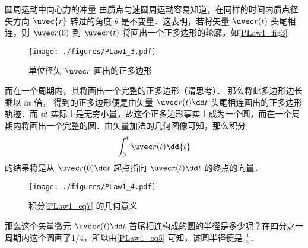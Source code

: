 \begin{example}{圆周运动中向心力的冲量}
由质点匀速圆周运动容易知道，在同样的时间内质点径矢方向 $\uvec{r}$ 转过的角度 $\theta$ 是不变量．这表明，若将矢量 $\uvec r(t)$ 头尾相连，则 $\uvec r(0)$ 到 $\uvec r(t)$ 将画出一个正多边形的轮廓，如\autoref{PLaw1_fig3} 
\begin{figure}[ht]
\centering
\texttt{[image: ./figures/PLaw1\_3.pdf]}
\caption{单位径矢 $\uvec r$ 画出的正多边形} \label{PLaw1_fig3}
\end{figure}
而在一个周期内，其将画出一个完整的正多边形（请思考）．
那么将此多边形边长乘以 $\dd t$ 倍， 得到的正多边形便是由矢量 $\uvec r(t)\dd t$ 头尾相连画出的正多边形轨迹．而 $\dd t$ 实际上是无穷小量，故这个正多边形事实上成为一个圆，而在一个周期内将画出一个完整的圆．由矢量加法的几何图像可知，那么积分
\begin{equation}\label{PLaw1_eq7}
\int_{0}^{t}\uvec r(t) \dd{t}
\end{equation}
的结果将是从 $\uvec r(0)\dd t$ 起点指向 $\uvec r(t)\dd t$ 的终点的向量．
\begin{figure}[ht]
\centering
\texttt{[image: ./figures/PLaw1\_4.pdf]}
\caption{积分\autoref{PLaw1_eq7} 的几何意义} \label{PLaw1_fig4}
\end{figure}
那么这个矢量微元 $\uvec r(t)\dd t$ 首尾相连构成的圆的半径是多少呢？在四分之一周期内这个圆画了1/4，所以由\autoref{PLaw1_eq5} 可知，该圆半径便是 $\frac{1}{\omega}$．
\end{example}
